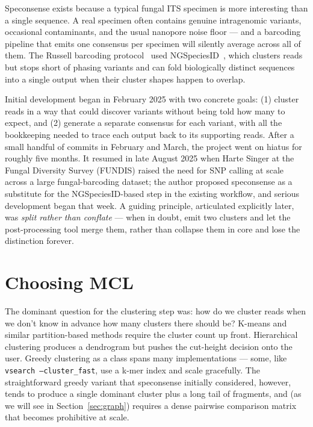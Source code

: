 \documentclass[11pt]{article}
\begin{document}
Speconsense exists because a typical fungal ITS specimen is more interesting
than a single sequence. A real specimen often contains genuine intragenomic
variants, occasional contaminants, and the usual nanopore noise floor --- and
a barcoding pipeline that emits one consensus per specimen will silently
average across all of them. The Russell barcoding
protocol~\cite{russell2023} used NGSpeciesID~\cite{ngspeciesid}, which clusters
reads but stops short of phasing variants and can fold biologically distinct
sequences into a single output when their cluster shapes happen to overlap.

Initial development began in February 2025 with two concrete goals: (1) cluster
reads in a way that could discover variants without being told how many to
expect, and (2) generate a separate consensus for each variant, with all the
bookkeeping needed to trace each output back to its supporting reads. After a
small handful of commits in February and March, the project went on hiatus for
roughly five months. It resumed in late August 2025 when Harte Singer at the
Fungal Diversity Survey (FUNDIS) raised the need for SNP calling at scale
across a large fungal-barcoding dataset; the author proposed speconsense as a
substitute for the NGSpeciesID-based step in the existing workflow, and serious
development began that week. A guiding principle, articulated explicitly later,
was \emph{split rather than conflate} --- when in doubt, emit two clusters and
let the post-processing tool merge them, rather than collapse them in core and
lose the distinction forever.

\section{Choosing MCL}

The dominant question for the clustering step was: how do we cluster reads
when we don't know in advance how many clusters there should be? K-means and
similar partition-based methods require the cluster count up front.
Hierarchical clustering produces a dendrogram but pushes the cut-height
decision onto the user. Greedy clustering as a class spans many
implementations --- some, like \texttt{vsearch --cluster\_fast}, use a
k-mer index and scale gracefully. The straightforward greedy variant
that speconsense initially considered, however, tends to produce a
single dominant cluster plus a long tail of fragments, and (as we will
see in Section~\ref{sec:graph}) requires a dense pairwise comparison
matrix that becomes prohibitive at scale.
\end{document}
